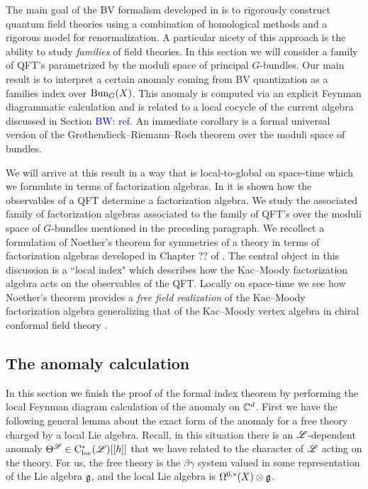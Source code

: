 \documentclass[10pt]{amsart}
\def\brian{\textcolor{blue}{BW: }\textcolor{blue}}
\begin{document}
The main goal of the BV formalism developed in \cite{CosBook} is to rigorously construct quantum field theories using a combination of homological methods and a rigorous model for renormalization. 
A particular nicety of this approach is the ability to study {\em families} of field theories. 
In this section we will consider a family of QFT's parametrized by the moduli space of principal $G$-bundles. 
Our main result is to interpret a certain anomaly coming from BV quantization as a families index over ${\rm Bun}_G(X)$. 
This anomaly is computed via an explicit Feynman diagrammatic calculation and is related to a local cocycle of the current algebra discussed in Section \brian{ref}. 
An immediate corollary is a formal universal version of the Grothendieck--Riemann--Roch theorem over the moduli space of bundles. 

We will arrive at this result in a way that is local-to-global on space-time which we formulate in terms of factorization algebras.
In \cite{CG1, CG2} it is shown how the observables of a QFT determine a factorization algebra. 
We study the associated family of factorization algebras associated to the family of QFT's over the moduli space of $G$-bundles mentioned in the preceding paragraph. 
We recollect a formulation of Noether's theorem for symmetries of a theory in terms of factorization algebras developed in Chapter ?? of \cite{CG2}. 
The central object in this discussion is a ``local index" which describes how the Kac--Moody factorization algebra acts on the observables of the QFT. 
Locally on space-time we see how Noether's theorem provides a {\em free field realization} of the Kac--Moody factorization algebra generalizing that of the Kac--Moody vertex algebra in chiral conformal field theory \cite{??}. 

\subsection{The anomaly calculation}

In this section we finish the proof of the formal index theorem by performing the local Feynman diagram calculation of the anomaly on $\mathbb C^d$. 
First we have the following general lemma about the exact form of the anomaly for a free theory charged by a local Lie algebra. 
Recall, in this situation there is an $\mathscr L$-dependent anomaly $\Theta^\mathscr L \in {\rm C}_{\rm loc}^*(\mathscr L)[[\hbar]]$ that we have related to the character of $\mathscr L$ acting on the theory. 
For us, the free theory is the $\beta\gamma$ system valued in some representation of the Lie algebra $\mathfrak g$, and the local Lie algebra is $\Omega^{0,*}(X) \otimes \mathfrak g$. 
\end{document}
